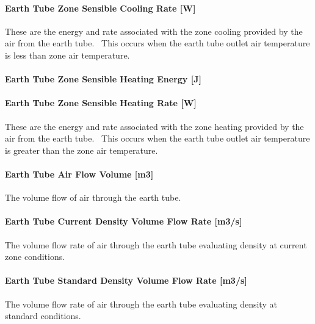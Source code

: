 \paragraph{Earth Tube Zone Sensible Cooling Rate {[}W{]}}\label{earth-tube-zone-sensible-cooling-rate-w}

These are the energy and rate associated with the zone cooling provided by the air from the earth tube.~ This occurs when the earth tube outlet air temperature is less than zone air temperature.

\paragraph{Earth Tube Zone Sensible Heating Energy {[}J{]}}\label{earth-tube-zone-sensible-heating-energy-j}

\paragraph{Earth Tube Zone Sensible Heating Rate {[}W{]}}\label{earth-tube-zone-sensible-heating-rate-w}

These are the energy and rate associated with the zone heating provided by the air from the earth tube.~ This occurs when the earth tube outlet air temperature is greater than the zone air temperature.

\paragraph{Earth Tube Air Flow Volume {[}m3{]}}\label{earth-tube-air-flow-volume-m3}

The volume flow of air through the earth tube.

\paragraph{Earth Tube Current Density Volume Flow Rate {[}m3/s{]}}\label{earth-tube-air-current-density-volumetric-flow-rate-m3s}

The volume flow rate of air through the earth tube evaluating density at current zone conditions.

\paragraph{Earth Tube Standard Density Volume Flow Rate {[}m3/s{]}}\label{earth-tube-air-standard-density-volumetric-flow-rate-m3s}

The volume flow rate of air through the earth tube evaluating density at standard conditions.

